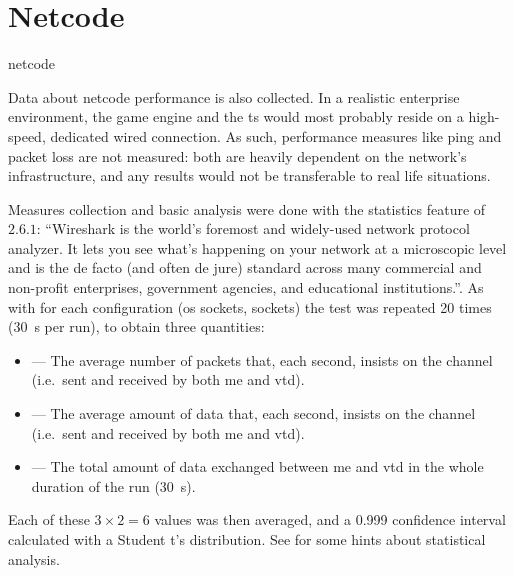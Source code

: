 \section{Netcode}\label{sc:performance:netcode}

\begin{definition}{netcode}
\end{definition}



Data about \gls{netcode} performance is also collected. In a realistic enterprise environment, the game engine and the \gls{ts} would most probably reside on a high-speed, dedicated wired connection. As such, performance measures like ping and packet loss are not measured: both are heavily dependent on the network's infrastructure, and any results would not be transferable to real life situations.

Measures collection and basic analysis were done with the statistics feature of  $2.6.1$: \enquote{Wireshark is the world’s foremost and widely-used network protocol analyzer. It lets you see what’s happening on your network at a microscopic level and is the de facto (and often de jure) standard across many commercial and non-profit enterprises, government agencies, and educational institutions.}{\cite{performance:wireshark}}. As with  for each configuration (\gls{os} sockets,  sockets) the test was repeated \num{20} times (\SI{30}{\second} per run), to obtain three quantities:

\begin{itemize}
	\item {} --- The average number of packets that, each second, insists on the channel (i.e.\ sent and received by both \gls{me} and \gls{vtd}).
	\item {} --- The average amount of data that, each second, insists on the channel (i.e.\ sent and received by both \gls{me} and \gls{vtd}).
	\item {} --- The total amount of data exchanged between \gls{me} and \gls{vtd} in the whole duration of the run (\SI{30}{\second}).
\end{itemize}

\FLOATnoindent Each of these $3\times2=6$ values was then averaged, and a \num{0,999} confidence interval calculated with a Student t's distribution. See  for some hints about statistical analysis.

